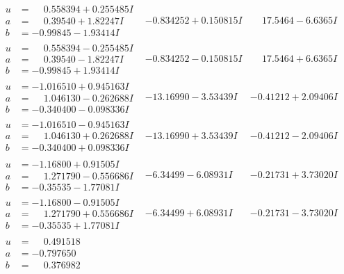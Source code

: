 \documentclass[1p]{elsarticle_modified}
\theoremstyle{definition}
\begin{document}
$$\begin{array}{c|c|c}
\begin{aligned}
u &= \phantom{-}0.558394 + 0.255485 I \\
a &= \phantom{-}0.39540 + 1.82247 I \\
b &= -0.99845 - 1.93414 I\end{aligned}
 & -0.834252 + 0.150815 I & \phantom{-}17.5464 - 6.6365 I \\ \hline\begin{aligned}
u &= \phantom{-}0.558394 - 0.255485 I \\
a &= \phantom{-}0.39540 - 1.82247 I \\
b &= -0.99845 + 1.93414 I\end{aligned}
 & -0.834252 - 0.150815 I & \phantom{-}17.5464 + 6.6365 I \\ \hline\begin{aligned}
u &= -1.016510 + 0.945163 I \\
a &= \phantom{-}1.046130 - 0.262688 I \\
b &= -0.340400 - 0.098336 I\end{aligned}
 & -13.16990 - 3.53439 I & -0.41212 + 2.09406 I \\ \hline\begin{aligned}
u &= -1.016510 - 0.945163 I \\
a &= \phantom{-}1.046130 + 0.262688 I \\
b &= -0.340400 + 0.098336 I\end{aligned}
 & -13.16990 + 3.53439 I & -0.41212 - 2.09406 I \\ \hline\begin{aligned}
u &= -1.16800 + 0.91505 I \\
a &= \phantom{-}1.271790 - 0.556686 I \\
b &= -0.35535 - 1.77081 I\end{aligned}
 & -6.34499 - 6.08931 I & -0.21731 + 3.73020 I \\ \hline\begin{aligned}
u &= -1.16800 - 0.91505 I \\
a &= \phantom{-}1.271790 + 0.556686 I \\
b &= -0.35535 + 1.77081 I\end{aligned}
 & -6.34499 + 6.08931 I & -0.21731 - 3.73020 I \\ \hline\begin{aligned}
u &= \phantom{-}0.491518\phantom{ +0.000000I} \\
a &= -0.797650\phantom{ +0.000000I} \\
b &= \phantom{-}0.376982\phantom{ +0.000000I}\end{aligned}

\end{array}$$
\end{document}
